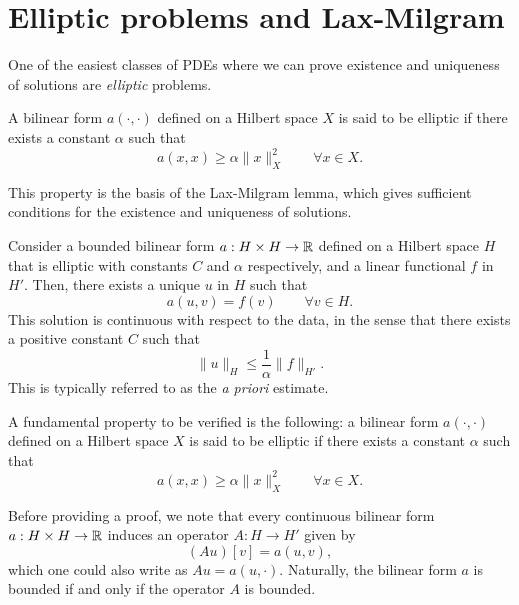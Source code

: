 \section{Elliptic problems and Lax-Milgram}
One of the easiest classes of PDEs where we can prove existence and uniqueness of solutions are \textit{elliptic} problems. 
\begin{definition}
    A bilinear form $a(\cdot, \cdot)$ defined on a Hilbert space $X$ is said to be elliptic if there exists a constant $\alpha$ such that
        \begin{equation*}
a(x, x) \geq \alpha \| x \|^2_X \qquad \forall x\in X.
\end{equation*}
\end{definition}
This property is the basis of the Lax-Milgram lemma, which gives sufficient conditions for the existence and uniqueness of solutions. 
\begin{lemma} Consider a bounded bilinear form $a: H\times H\to \mathbb{R}$ defined on a Hilbert space $H$ that is elliptic with constants $C$ and $\alpha$ respectively, and a linear functional $f$ in $H'$. Then, there exists a unique $u$ in $H$ such that 
    \begin{equation*}
a(u, v) = f(v) \qquad \forall v \in H.
\end{equation*}
This solution is continuous with respect to the data, in the sense that there exists a positive constant $C$ such that 
    \begin{equation*}
\| u\|_H \leq \frac 1 \alpha \| f \|_{H'} .
\end{equation*}
This is typically referred to as the \emph{a priori} estimate. 
\end{lemma}


 A fundamental property to be verified is the following: a bilinear form $a(\cdot, \cdot)$ defined on a Hilbert space $X$ is said to be elliptic if there exists a constant $\alpha$ such that
        \begin{equation*}
a(x, x) \geq \alpha \| x \|^2_X \qquad \forall x\in X.
\end{equation*}

Before providing a proof, we note that every continuous bilinear form $a:H\times H\to \mathbb{R}$ induces an operator $A:H\to H'$ given by
    \begin{equation*}
(Au)[v] = a(u,v),
\end{equation*}
which one could also write as $Au = a(u, \cdot)$. Naturally, the bilinear form $a$ is bounded if and only if the operator $A$ is bounded. 


